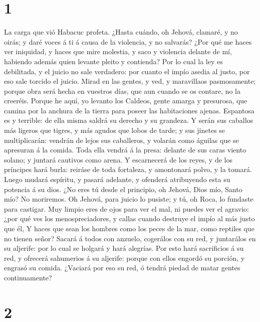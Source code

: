 \hypertarget{section}{%
\section{1}\label{section}}

 La carga que vió Habacuc profeta.  ¿Hasta
cuándo, oh Jehová, clamaré, y no oirás; y daré voces á ti á causa de la
violencia, y no salvarás?  ¿Por qué me haces ver iniquidad,
y haces que mire molestia, y saco y violencia delante de mí, habiendo
además quien levante pleito y contienda?  Por lo cual la ley
es debilitada, y el juicio no sale verdadero: por cuanto el impío asedia
al justo, por eso sale torcido el juicio.  Mirad en las
gentes, y ved, y maravillaos pasmosamente; porque obra será hecha en
vuestros días, que aun cuando se os contare, no la creeréis.
 Porque he aquí, yo levanto los Caldeos, gente amarga y
presurosa, que camina por la anchura de la tierra para poseer las
habitaciones ajenas.  Espantosa es y terrible: de ella misma
saldrá su derecho y su grandeza.  Y serán sus caballos más
ligeros que tigres, y más agudos que lobos de tarde; y sus jinetes se
multiplicarán: vendrán de lejos sus caballeros, y volarán como águilas
que se apresuran á la comida.  Toda ella vendrá á la presa:
delante de sus caras viento solano; y juntará cautivos como arena.
 Y escarnecerá de los reyes, y de los príncipes hará burla:
reiráse de toda fortaleza, y amontonará polvo, y la tomará.
 Luego mudará espíritu, y pasará adelante, y ofenderá
atribuyendo esta su potencia á su dios.  ¿No eres tú desde
el principio, oh Jehová, Dios mío, Santo mío? No moriremos. Oh Jehová,
para juicio lo pusiste; y tú, oh Roca, lo fundaste para castigar.
 Muy limpio eres de ojos para ver el mal, ni puedes ver el
agravio: ¿por qué ves los menospreciadores, y callas cuando destruye el
impío al más justo que él,  Y haces que sean los hombres
como los peces de la mar, como reptiles que no tienen señor?
 Sacará á todos con anzuelo, cogerálos con su red, y
juntarálos en su aljerife: por lo cual se holgará y hará alegrías.
 Por esto hará sacrificios á su red, y ofrecerá sahumerios
á su aljerife: porque con ellos engordó su porción, y engrasó su comida.
 ¿Vaciará por eso su red, ó tendrá piedad de matar gentes
continuamente?

\hypertarget{section-1}{%
\section{2}\label{section-1}}


